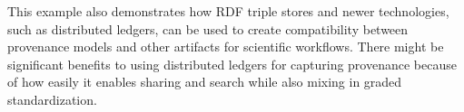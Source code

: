This example also demonstrates how RDF triple stores and newer technologies,
such as distributed ledgers, can be used to create compatibility between
provenance models and other artifacts for scientific workflows. There might be
significant benefits to using distributed ledgers for capturing provenance
because of how easily it enables sharing and search while also mixing in graded
standardization.